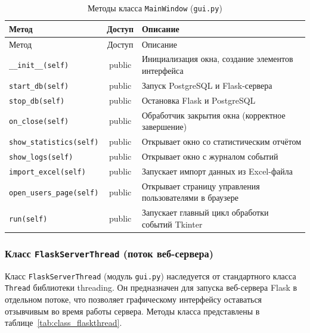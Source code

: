 \begin{xltabular}{\textwidth}{|>{\raggedright\arraybackslash}p{6cm}|c|X|}
	\caption{Методы класса \texttt{MainWindow} (\texttt{gui.py})\label{tab:class_mainwindow}}\\ \hline
	\centrow Метод & \centrow Доступ & \centrow Описание \\ \hline
	\endfirsthead
	\centrow Метод & \centrow Доступ & \centrow Описание \\ \hline
	\finishhead
	\texttt{\_\_init\_\_(self)} & public & Инициализация окна, создание элементов интерфейса \\ \hline
	\texttt{start\_db(self)} & public & Запуск PostgreSQL и Flask-сервера \\ \hline
	\texttt{stop\_db(self)} & public & Остановка Flask и PostgreSQL \\ \hline
	\texttt{on\_close(self)} & public & Обработчик закрытия окна (корректное завершение) \\ \hline
	\texttt{show\_statistics(self)} & public & Открывает окно со статистическим отчётом \\ \hline
	\texttt{show\_logs(self)} & public & Открывает окно с журналом событий \\ \hline
	\texttt{import\_excel(self)} & public & Запускает импорт данных из Excel-файла \\ \hline
	\texttt{open\_users\_page(self)} & public & Открывает страницу управления пользователями в браузере \\ \hline
	\texttt{run(self)} & public & Запускает главный цикл обработки событий Tkinter \\ \hline
\end{xltabular}

\subsubsection{Класс \texttt{FlaskServerThread} (поток веб-сервера)}

Класс \texttt{FlaskServerThread} (модуль \texttt{gui.py}) наследуется от стандартного класса \texttt{Thread} библиотеки threading. Он предназначен для запуска веб-сервера Flask в отдельном потоке, что позволяет графическому интерфейсу оставаться отзывчивым во время работы сервера. Методы класса представлены в таблице~\ref{tab:class_flaskthread}.

